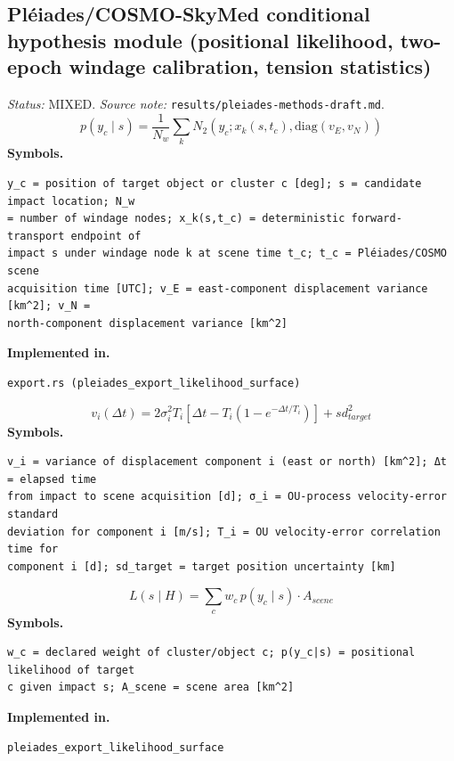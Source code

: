 \documentclass[11pt,a4paper]{article}
\begin{document}
\subsection{Pléiades/COSMO-SkyMed conditional hypothesis module (positional likelihood, two-epoch windage calibration, tension statistics)}
\noindent\textit{Status:} MIXED. \textit{Source note:} \texttt{results/pleiades-methods-draft.md}.
\medskip
\begin{equation}
p(y_c \mid s) = \frac{1}{N_w} \sum_k N_2\!\left(y_c ; x_k(s, t_c), \mathrm{diag}(v_E, v_N)\right)
\end{equation}
\noindent\textbf{Symbols.}
\begin{verbatim}
y_c = position of target object or cluster c [deg]; s = candidate impact location; N_w
= number of windage nodes; x_k(s,t_c) = deterministic forward-transport endpoint of
impact s under windage node k at scene time t_c; t_c = Pléiades/COSMO scene
acquisition time [UTC]; v_E = east-component displacement variance [km^2]; v_N =
north-component displacement variance [km^2]
\end{verbatim}
\noindent\textbf{Implemented in.}
\begin{verbatim}
export.rs (pleiades_export_likelihood_surface)
\end{verbatim}
\medskip
\begin{equation}
v_i(\Delta t) = 2\sigma_i^2 T_i\left[\Delta t - T_i\left(1 - e^{-\Delta t / T_i}\right)\right] + sd_{target}^2
\end{equation}
\noindent\textbf{Symbols.}
\begin{verbatim}
v_i = variance of displacement component i (east or north) [km^2]; Δt = elapsed time
from impact to scene acquisition [d]; σ_i = OU-process velocity-error standard
deviation for component i [m/s]; T_i = OU velocity-error correlation time for
component i [d]; sd_target = target position uncertainty [km]
\end{verbatim}
\medskip
\begin{equation}
L(s \mid H) = \sum_c w_c\, p(y_c \mid s) \cdot A_{scene}
\end{equation}
\noindent\textbf{Symbols.}
\begin{verbatim}
w_c = declared weight of cluster/object c; p(y_c|s) = positional likelihood of target
c given impact s; A_scene = scene area [km^2]
\end{verbatim}
\noindent\textbf{Implemented in.}
\begin{verbatim}
pleiades_export_likelihood_surface
\end{verbatim}
\end{document}
